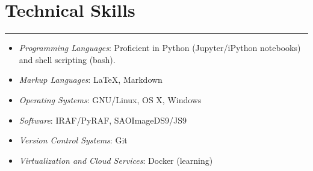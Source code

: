 \documentclass[letterpaper,10pt]{article}
\begin{document}
\section*{Technical Skills}
\hrule
\vspace{.3 cm}
    \begin{multicols}{2}




\begin{itemize}[label=$\blacktriangleright$]
	\item \emph{Programming Languages}: Proficient in Python (Jupyter/iPython notebooks) and shell scripting (bash). 
\end{itemize}

  \begin{itemize}[label=$\blacktriangleright$]
        \item \emph{Markup Languages}: \LaTeX, Markdown
  \end{itemize}

  \begin{itemize}[label=$\blacktriangleright$]
  \item \emph{Operating Systems}: GNU/Linux, OS X, Windows
    \end{itemize}

  \begin{itemize}[label=$\blacktriangleright$]
          \item \emph{Software}: IRAF/PyRAF, SAOImageDS9/JS9
    \end{itemize}

  \begin{itemize}[label=$\blacktriangleright$]
          \item \emph{Version Control Systems}: Git
    \end{itemize}
  
    \begin{itemize}[label=$\blacktriangleright$]
            \item \emph{Virtualization and Cloud Services}: Docker (learning)
    \end{itemize}
    
    
        \end{multicols}
\end{document}
